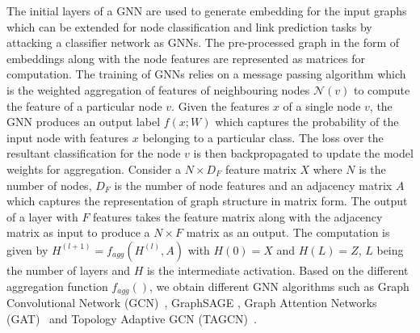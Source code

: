 The initial layers of a GNN are used to generate embedding for the input graphs which can be extended for node classification and link prediction tasks by attacking a classifier network as GNNs.
The pre-processed graph in the form of embeddings along with the node features are represented as matrices for computation.
The training of GNNs relies on a message passing algorithm which is the weighted aggregation of features of neighbouring nodes $\mathcal{N}(v)$ to compute the feature of a particular node $v$.
Given the features $x$ of a single node $v$, the GNN produces an output label $f(x;W)$ which captures the probability of the input node with features $x$ belonging to a particular class.
The loss over the resultant classification for the node $v$ is then backpropagated to update the model weights for aggregation.
Consider a $N\times D_F$ feature matrix $X$ where $N$ is the number of nodes, $D_F$ is the number of node features and an adjacency matrix $A$ which captures the representation of graph structure in matrix form.
The output of a layer with $F$ features takes the feature matrix along with the adjacency matrix as input to produce a $N\times F$ matrix as an output.
The computation is given by $H^{(l+1)} = f_{agg}(H^{(l)}, A)$ with $H(0)=X$ and $H(L)=Z$, $L$ being the number of layers and $H$ is the intermediate activation.
Based on the different aggregation function $f_{agg}()$, we obtain different GNN algorithms such as Graph Convolutional Network (GCN)~\cite{Kipf2016tc}, GraphSAGE \cite{NIPS20176703}, Graph Attention Networks (GAT)~\cite{velickovic2018graph} and Topology Adaptive GCN (TAGCN)~\cite{du2018topology}.

